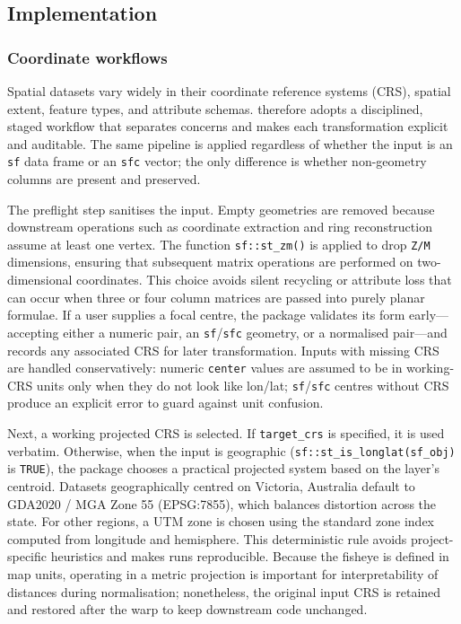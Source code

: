 \subsection{Implementation}\label{implementation}

\subsubsection{Coordinate workflows}\label{coordinate-workflows}

Spatial datasets vary widely in their coordinate reference systems (CRS), spatial extent, feature
types, and attribute schemas.  therefore adopts a disciplined, staged workflow
that separates concerns and makes each transformation explicit and auditable. The same pipeline is
applied regardless of whether the input is an \texttt{sf} data frame or an \texttt{sfc} vector; the only
difference is whether non-geometry columns are present and preserved.

The preflight step sanitises the input. Empty geometries are removed because downstream operations
such as coordinate extraction and ring reconstruction assume at least one vertex. The function
\texttt{sf::st\_zm()} is applied to drop \texttt{Z/M} dimensions, ensuring that subsequent matrix operations are
performed on two-dimensional coordinates. This choice avoids silent recycling or attribute loss that
can occur when three or four column matrices are passed into purely planar formulae. If a user
supplies a focal centre, the package validates its form early---accepting either a numeric pair, an
\texttt{sf}/\texttt{sfc} geometry, or a normalised pair---and records any associated CRS for later
transformation. Inputs with missing CRS are handled conservatively: numeric \texttt{center} values are
assumed to be in working-CRS units only when they do not look like lon/lat; \texttt{sf}/\texttt{sfc}
centres without CRS produce an explicit error to guard against unit confusion.

Next, a working projected CRS is selected. If \texttt{target\_crs} is specified, it is used verbatim.
Otherwise, when the input is geographic (\texttt{sf::st\_is\_longlat(sf\_obj)} is \texttt{TRUE}), the
package chooses a practical projected system based on the layer's centroid. Datasets geographically
centred on Victoria, Australia default to GDA2020 / MGA Zone 55 (EPSG:7855), which balances
distortion across the state. For other regions, a UTM zone is chosen using the standard zone index
computed from longitude and hemisphere. This deterministic rule avoids project-specific heuristics
and makes runs reproducible. Because the fisheye is defined in map units, operating in a metric
projection is important for interpretability of distances during normalisation; nonetheless, the
original input CRS is retained and restored after the warp to keep downstream code unchanged.


